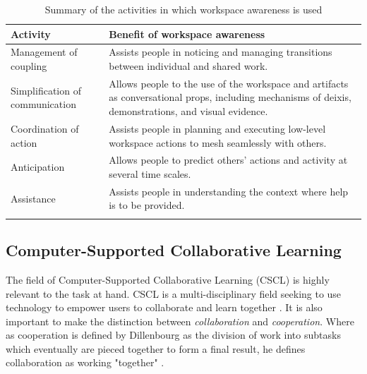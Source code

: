 \begin{table}[!h]
      \centering
        \caption{Summary of the activities in which workspace awareness is used}
        \begin{tabularx}{\textwidth}{l X}
        \toprule
        Activity & Benefit of workspace awareness \\
        \midrule
        \vspace{0.2cm}
        Management of coupling & Assists people in noticing and managing transitions between individual and shared work.\\
        \vspace{0.2cm}
        Simplification of communication & Allows people to the use of the workspace and artifacts as conversational props, including mechanisms of deixis, demonstrations, and visual evidence.\\\vspace{0.2cm}
        Coordination of action & Assists people in planning and executing low-level workspace actions to mesh seamlessly with others.\\\vspace{0.2cm}
        Anticipation & Allows people to predict others’ actions and activity at several time scales.\\\vspace{0.2cm}
        Assistance & Assists people in understanding the context where help is to be provided.\\
        \bottomrule
        \label{table:awarenessActivity}
        \end{tabularx}
\end{table}



\subsection{Computer-Supported Collaborative Learning} \label{CSCL}
\label{section:CSCL}
The field of Computer-Supported Collaborative Learning (CSCL) is highly relevant to the task at hand. CSCL is a multi-disciplinary field seeking to use technology to empower users to collaborate and learn together \cite{stahl2006computer}.  It is also important to make the distinction between \textit{collaboration} and \textit{cooperation}. Where as cooperation is defined by Dillenbourg as the division of work into subtasks which eventually are pieced together to form a final result, he defines collaboration as working "together" \cite{dillenbourg1999you}.

